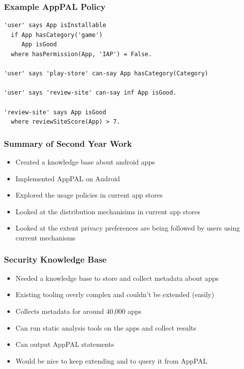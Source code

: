 \documentclass{beamer}
\begin{document}
\begin{frame}[fragile]
  \frametitle{Example AppPAL Policy}
  \begin{center}
  \begin{lstlisting}[columns=flexible,basicstyle=\ttfamily\footnotesize]
'user' says App isInstallable
  if App hasCategory('game')
     App isGood
  where hasPermission(App, 'IAP') = False.

'user' says 'play-store' can-say App hasCategory(Category) 

'user' says 'review-site' can-say inf App isGood.

'review-site' says App isGood
  where reviewSiteScore(App) > 7.
  \end{lstlisting}
  \end{center}
\end{frame}

\begin{frame}
  \frametitle{Summary of Second Year Work}
  \begin{itemize}
    \item Created a knowledge base about android apps
    \item Implemented AppPAL on Android
    \item Explored the usage policies in current app stores
    \item Looked at the distribution mechanisims in current app stores
    \item Looked at the extent privacy preferences are being followed by users
      using current mechanisms
  \end{itemize}
\end{frame}

\begin{frame}
  \frametitle{Security Knowledge Base}
  \begin{itemize}
  \item Needed a knowledge base to store and collect metadata about apps
  \item Existing tooling overly complex and couldn't be extended (easily)
  \item Collects metadata for around 40,000 apps
  \item Can run static analysis tools on the apps and collect results
  \item Can output AppPAL statements
  \item Would be nice to keep extending and to query it from AppPAL
  \end{itemize}
\end{frame}
\end{document}
